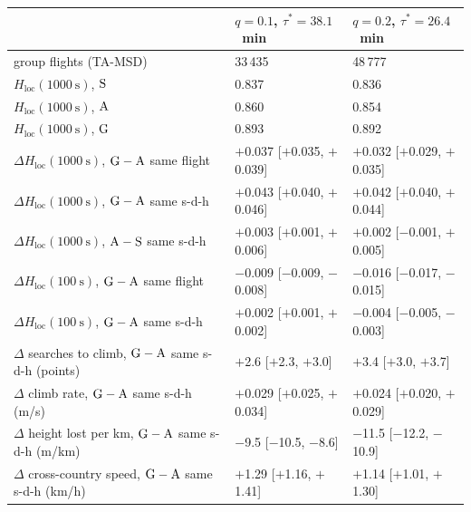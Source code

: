\begin{tabular}{@{}l l l@{}}
\toprule
 & $q=0.1$, $\tau^*=38.1$~min & $q=0.2$, $\tau^*=26.4$~min \\
\midrule
group flights (TA-MSD) & 33\,435 & 48\,777 \\
$H_\mathrm{loc}(1000~\mathrm{s})$, $\mathrm{S}$ & 0.837 & 0.836 \\
$H_\mathrm{loc}(1000~\mathrm{s})$, $\mathrm{A}$ & 0.860 & 0.854 \\
$H_\mathrm{loc}(1000~\mathrm{s})$, $\mathrm{G}$ & 0.893 & 0.892 \\
$\Delta H_\mathrm{loc}(1000~\mathrm{s})$, $\mathrm{G}-\mathrm{A}$ same flight & $+$0.037 [$+$0.035, $+$0.039] & $+$0.032 [$+$0.029, $+$0.035] \\
$\Delta H_\mathrm{loc}(1000~\mathrm{s})$, $\mathrm{G}-\mathrm{A}$ same s-d-h & $+$0.043 [$+$0.040, $+$0.046] & $+$0.042 [$+$0.040, $+$0.044] \\
$\Delta H_\mathrm{loc}(1000~\mathrm{s})$, $\mathrm{A}-\mathrm{S}$ same s-d-h & $+$0.003 [$+$0.001, $+$0.006] & $+$0.002 [$-$0.001, $+$0.005] \\
$\Delta H_\mathrm{loc}(100~\mathrm{s})$, $\mathrm{G}-\mathrm{A}$ same flight & $-$0.009 [$-$0.009, $-$0.008] & $-$0.016 [$-$0.017, $-$0.015] \\
$\Delta H_\mathrm{loc}(100~\mathrm{s})$, $\mathrm{G}-\mathrm{A}$ same s-d-h & $+$0.002 [$+$0.001, $+$0.002] & $-$0.004 [$-$0.005, $-$0.003] \\
$\Delta$ searches to climb, $\mathrm{G}-\mathrm{A}$ same s-d-h (points) & $+$2.6 [$+$2.3, $+$3.0] & $+$3.4 [$+$3.0, $+$3.7] \\
$\Delta$ climb rate, $\mathrm{G}-\mathrm{A}$ same s-d-h (m/s) & $+$0.029 [$+$0.025, $+$0.034] & $+$0.024 [$+$0.020, $+$0.029] \\
$\Delta$ height lost per km, $\mathrm{G}-\mathrm{A}$ same s-d-h (m/km) & $-$9.5 [$-$10.5, $-$8.6] & $-$11.5 [$-$12.2, $-$10.9] \\
$\Delta$ cross-country speed, $\mathrm{G}-\mathrm{A}$ same s-d-h (km/h) & $+$1.29 [$+$1.16, $+$1.41] & $+$1.14 [$+$1.01, $+$1.30] \\
\bottomrule
\end{tabular}
